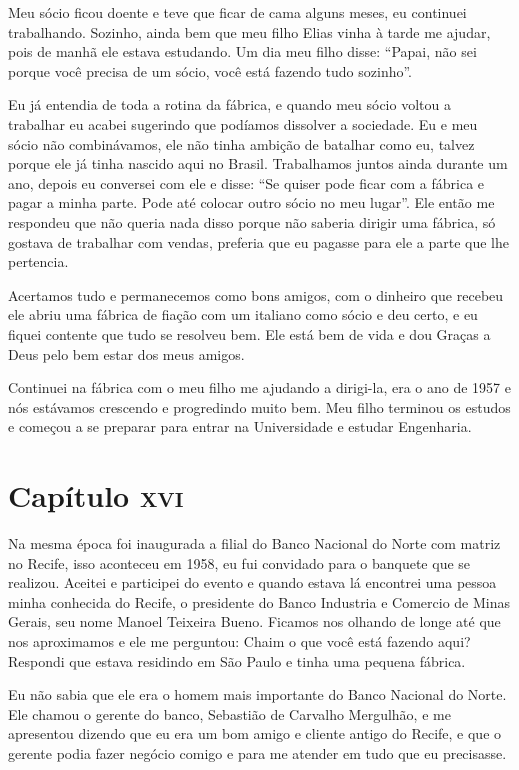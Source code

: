 Meu sócio ficou doente e teve que ficar de cama alguns meses, eu
continuei trabalhando. Sozinho, ainda bem que meu filho Elias vinha à
tarde me ajudar, pois de manhã ele estava estudando. Um dia meu filho
disse: ``Papai, não sei porque você precisa de um sócio, você está
fazendo tudo sozinho''.

Eu já entendia de toda a rotina da fábrica, e quando meu sócio voltou a
trabalhar eu acabei sugerindo que podíamos dissolver a sociedade. Eu e
meu sócio não combinávamos, ele não tinha ambição de batalhar como eu,
talvez porque ele já tinha nascido aqui no Brasil. Trabalhamos juntos
ainda durante um ano, depois eu conversei com ele e disse: ``Se quiser
pode ficar com a fábrica e pagar a minha parte. Pode até colocar outro
sócio no meu lugar''. Ele então me respondeu que não queria nada disso
porque não saberia dirigir uma fábrica, só gostava de trabalhar com
vendas, preferia que eu pagasse para ele a parte que lhe pertencia.

Acertamos tudo e permanecemos como bons amigos, com o dinheiro que
recebeu ele abriu uma fábrica de fiação com um italiano como sócio e deu
certo, e eu fiquei contente que tudo se resolveu bem. Ele está bem de
vida e dou Graças a Deus pelo bem estar dos meus amigos.

Continuei na fábrica com o meu filho me ajudando a dirigi-la, era o ano
de 1957 e nós estávamos crescendo e progredindo muito bem. Meu filho
terminou os estudos e começou a se preparar para entrar na Universidade
e estudar Engenharia.

\chapter{Capítulo \textsc{xvi}}

Na mesma época foi inaugurada a filial do Banco Nacional do Norte com
matriz no Recife, isso aconteceu em 1958, eu fui convidado para o
banquete que se realizou. Aceitei e participei do evento e quando estava
lá encontrei uma pessoa minha conhecida do Recife, o presidente do Banco
Industria e Comercio de Minas Gerais, seu nome Manoel Teixeira Bueno.
Ficamos nos olhando de longe até que nos aproximamos e ele me perguntou:
Chaim o que você está fazendo aqui? Respondi que estava residindo em São
Paulo e tinha uma pequena fábrica.

Eu não sabia que ele era o homem mais importante do Banco Nacional do
Norte. Ele chamou o gerente do banco, Sebastião de Carvalho Mergulhão, e
me apresentou dizendo que eu era um bom amigo e cliente antigo do
Recife, e que o gerente podia fazer negócio comigo e para me atender em
tudo que eu precisasse.

